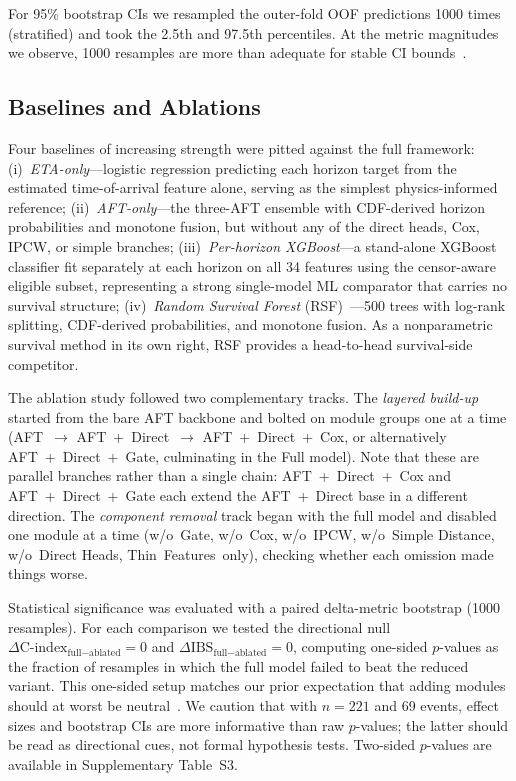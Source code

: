 \documentclass[fire,article,submit,pdftex]{../Definitions/mdpi}
\begin{document}
For 95\% bootstrap CIs we resampled the outer-fold OOF predictions 1000 times (stratified) and took the 2.5th and 97.5th percentiles. At the metric magnitudes we observe, 1000 resamples are more than adequate for stable CI bounds~\cite{Efron1993}.

\subsection{Baselines and Ablations}\label{sec:baselines}

Four baselines of increasing strength were pitted against the full framework:
(i)~\emph{ETA-only}---logistic regression predicting each horizon target from the estimated time-of-arrival feature alone, serving as the simplest physics-informed reference;
(ii)~\emph{AFT-only}---the three-AFT ensemble with CDF-derived horizon probabilities and monotone fusion, but without any of the direct heads, Cox, IPCW, or simple branches;
(iii)~\emph{Per-horizon XGBoost}---a stand-alone XGBoost classifier fit separately at each horizon on all 34 features using the censor-aware eligible subset, representing a strong single-model ML comparator that carries no survival structure;
(iv)~\emph{Random Survival Forest} (RSF)~\cite{Ishwaran2008}---500 trees with log-rank splitting, CDF-derived probabilities, and monotone fusion. As a nonparametric survival method in its own right, RSF provides a head-to-head survival-side competitor.

The ablation study followed two complementary tracks.
The \emph{layered build-up} started from the bare AFT backbone and bolted on module groups one at a time (AFT~$\to$ AFT~+~Direct~$\to$ AFT~+~Direct~+~Cox, or alternatively AFT~+~Direct~+~Gate, culminating in the Full model). Note that these are parallel branches rather than a single chain: AFT~+~Direct~+~Cox and AFT~+~Direct~+~Gate each extend the AFT~+~Direct base in a different direction.
The \emph{component removal} track began with the full model and disabled one module at a time (w/o~Gate, w/o~Cox, w/o~IPCW, w/o~Simple Distance, w/o~Direct Heads, Thin~Features~only), checking whether each omission made things worse.

Statistical significance was evaluated with a paired delta-metric bootstrap (1000 resamples). For each comparison we tested the directional null $\Delta\text{C-index}_{\text{full} - \text{ablated}} = 0$ and $\Delta\text{IBS}_{\text{full} - \text{ablated}} = 0$, computing one-sided $p$-values as the fraction of resamples in which the full model failed to beat the reduced variant. This one-sided setup matches our prior expectation that adding modules should at worst be neutral~\cite{Collins2024}.
We caution that with $n = 221$ and 69 events, effect sizes and bootstrap CIs are more informative than raw $p$-values; the latter should be read as directional cues, not formal hypothesis tests.
Two-sided $p$-values are available in Supplementary Table~S3.
\end{document}
